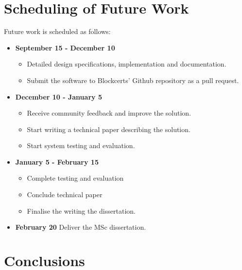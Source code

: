 \documentclass[llncsdoc]{llncs}
\begin{document}
\section{Scheduling of Future Work}
\label{sec:fwork}

Future work is scheduled as follows:

\begin{itemize}
\item \textbf{September 15 - December 10} 
    \begin{itemize}
        \item Detailed design specifications, implementation and documentation.
        \item Submit the software to Blockcerts' Github repository as a pull request.
    \end{itemize}
\item \textbf{December 10 - January 5}
    \begin{itemize}
        \item Receive community feedback and improve the solution. 
        \item Start writing a technical paper describing the solution. 
        \item Start system testing and evaluation.
    \end{itemize}
\item \textbf{January 5 - February 15} 
    \begin{itemize}
        \item Complete testing and evaluation
        \item Conclude technical paper
        \item Finalise the writing the dissertation.
    \end{itemize}
\item \textbf{February 20} Deliver the MSc dissertation.

\end{itemize}

\section{Conclusions}
\label{sec:conclusions}






\end{document}
